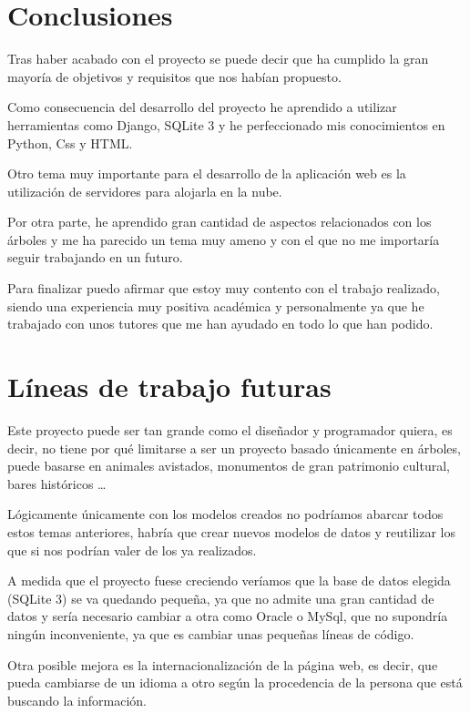 
\section{Conclusiones} 

Tras haber acabado con el proyecto se puede decir que ha cumplido la gran mayoría de objetivos y requisitos que nos habían propuesto.

Como consecuencia del desarrollo del proyecto he aprendido a utilizar herramientas como Django, SQLite 3 y he perfeccionado mis conocimientos en Python, Css y HTML.

Otro tema muy importante para el desarrollo de la aplicación web es la utilización de servidores para alojarla en la nube.

Por otra parte, he aprendido gran cantidad de aspectos relacionados con los árboles y me ha parecido un tema muy ameno y con el que no me importaría seguir trabajando en un futuro.

Para finalizar puedo afirmar que estoy muy contento con el trabajo realizado, siendo una experiencia muy positiva académica y personalmente ya que he trabajado con unos tutores que me han ayudado en todo lo que han podido.

\section{Líneas de trabajo futuras} 

Este proyecto puede ser tan grande como el diseñador y programador quiera, es decir, no tiene por qué limitarse a ser un proyecto basado únicamente en árboles, puede basarse en animales avistados, monumentos de gran patrimonio cultural, bares históricos \ldots 

Lógicamente únicamente con los modelos creados no podríamos abarcar todos estos temas anteriores, habría que crear nuevos modelos de datos y reutilizar los que si nos podrían valer de los ya realizados.

A medida que el proyecto fuese creciendo veríamos que la base de datos elegida (SQLite 3) se va quedando pequeña, ya que no admite una gran cantidad de datos y sería necesario cambiar a otra como Oracle o MySql, que no supondría ningún inconveniente, ya que es cambiar unas pequeñas líneas de código.  

Otra posible mejora es la internacionalización de la página web, es decir, que pueda cambiarse de un idioma a otro según la procedencia de la persona que está buscando la información.

 
